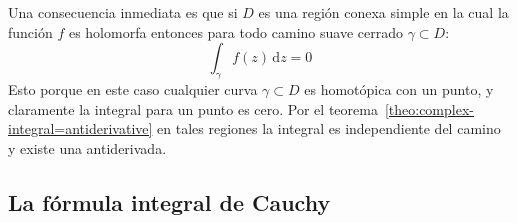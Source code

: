   Una consecuencia inmediata es que si \(D\)
  es una región conexa simple
  en la cual la función \(f\) es holomorfa
  entonces para todo camino suave cerrado \(\gamma \subset D\):
  \begin{equation*}
    \int_\gamma f(z) \, \mathrm{d} z
      = 0
  \end{equation*}
  Esto porque en este caso
  cualquier curva \(\gamma \subset D\) es homotópica con un punto,
  y claramente la integral para un punto es cero.
  Por el teorema~\ref{theo:complex-integral=antiderivative}
  en tales regiones la integral es independiente del camino
  y existe una antiderivada.

\subsection{La fórmula integral de Cauchy}
\label{sec:Cauchy-integral-formula}

